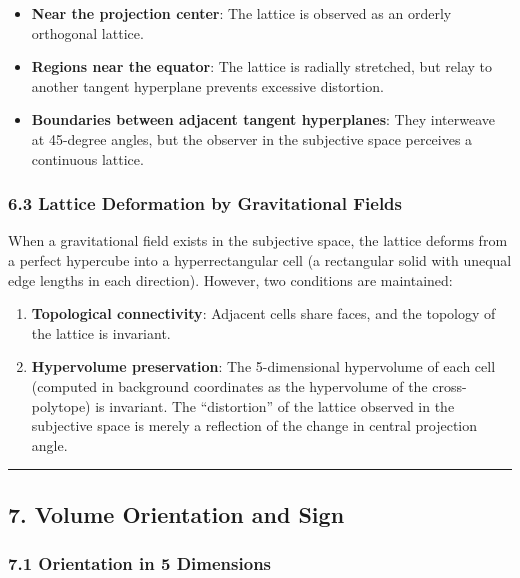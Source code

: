 \documentclass[a4paper,11pt]{article}
\providecommand{\tightlist}{\setlength{\itemsep}{0pt}\setlength{\parskip}{0pt}}
\begin{document}
\begin{itemize}
\tightlist
\item
  \textbf{Near the projection center}: The lattice is observed as an
  orderly orthogonal lattice.
\item
  \textbf{Regions near the equator}: The lattice is radially stretched,
  but relay to another tangent hyperplane prevents excessive distortion.
\item
  \textbf{Boundaries between adjacent tangent hyperplanes}: They
  interweave at 45-degree angles, but the observer in the subjective
  space perceives a continuous lattice.
\end{itemize}

\subsubsection{6.3 Lattice Deformation by Gravitational
Fields}\label{lattice-deformation-by-gravitational-fields}

When a gravitational field exists in the subjective space, the lattice
deforms from a perfect hypercube into a hyperrectangular cell (a
rectangular solid with unequal edge lengths in each direction). However,
two conditions are maintained:

\begin{enumerate}
\def\labelenumi{\arabic{enumi}.}
\tightlist
\item
  \textbf{Topological connectivity}: Adjacent cells share faces, and the
  topology of the lattice is invariant.
\item
  \textbf{Hypervolume preservation}: The 5-dimensional hypervolume of
  each cell (computed in background coordinates as the hypervolume of
  the cross-polytope) is invariant. The ``distortion'' of the lattice
  observed in the subjective space is merely a reflection of the change
  in central projection angle.
\end{enumerate}

\begin{center}\rule{0.5\linewidth}{0.5pt}\end{center}

\subsection{7. Volume Orientation and
Sign}\label{volume-orientation-and-sign}

\subsubsection{7.1 Orientation in 5
Dimensions}\label{orientation-in-5-dimensions}
\end{document}
